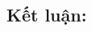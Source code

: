 \documentclass[a0,portrait,11pt]{a0poster}
\begin{document}
\begin{mybox}
\begin{multicols}{3}
\begin{mybox}
\subsection*{Kết luận:}
\end{mybox}
\end{multicols}
\end{mybox}
\end{document}
